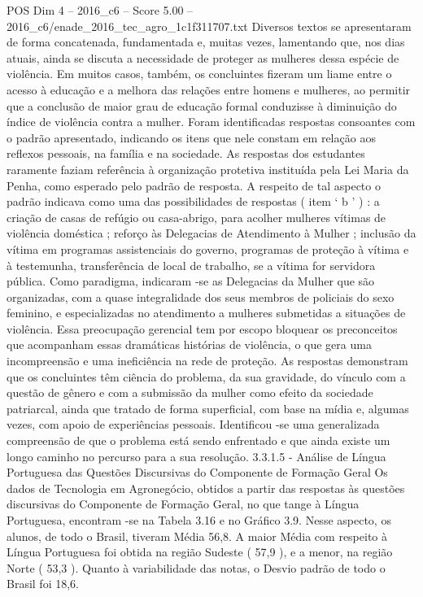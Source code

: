 \begin{textsample}{POS Dim 4 – 2016\_c6 – Score 5.00 – 2016\_c6/enade\_2016\_tec\_agro\_1c1f311707.txt}
Diversos textos se apresentaram de forma concatenada, fundamentada e, muitas vezes, lamentando que, nos dias atuais, ainda se discuta a necessidade de proteger as mulheres dessa espécie de violência.
Em muitos casos, também, os concluintes fizeram um liame entre o acesso à educação e a melhora das relações entre homens e mulheres, ao permitir que a conclusão de maior grau de educação formal conduzisse à diminuição do índice de violência contra a mulher.
Foram identificadas respostas consoantes com o padrão apresentado, indicando os itens que nele constam em relação aos reflexos pessoais, na família e na sociedade.
As respostas dos estudantes raramente faziam referência à organização protetiva instituída pela Lei Maria da Penha, como esperado pelo padrão de resposta.
A respeito de tal aspecto o padrão indicava como uma das possibilidades de respostas ( item ‘ b ’ ) : a criação de casas de refúgio ou casa-abrigo, para acolher mulheres vítimas de violência doméstica ; reforço às Delegacias de Atendimento à Mulher ; inclusão da vítima em programas assistenciais do governo, programas de proteção à vítima e à testemunha, transferência de local de trabalho, se a vítima for servidora pública.
Como paradigma, indicaram -se as Delegacias da Mulher que são organizadas, com a quase integralidade dos seus membros de policiais do sexo feminino, e especializadas no atendimento a mulheres submetidas a situações de violência.
Essa preocupação gerencial tem por escopo bloquear os preconceitos que acompanham essas dramáticas histórias de violência, o que gera uma incompreensão e uma ineficiência na rede de proteção.
As respostas demonstram que os concluintes têm ciência do problema, da sua gravidade, do vínculo com a questão de gênero e com a submissão da mulher como efeito da sociedade patriarcal, ainda que tratado de forma superficial, com base na mídia e, algumas vezes, com apoio de experiências pessoais.
Identificou -se uma generalizada compreensão de que o problema está sendo enfrentado e que ainda existe um longo caminho no percurso para a sua resolução. 3.3.1.5 - Análise de Língua Portuguesa das Questões Discursivas do Componente de Formação Geral Os dados de Tecnologia em Agronegócio, obtidos a partir das respostas às questões discursivas do Componente de Formação Geral, no que tange à Língua Portuguesa, encontram -se na Tabela 3.16 e no Gráfico 3.9.
Nesse aspecto, os alunos, de todo o Brasil, tiveram Média 56,8.
A maior Média com respeito à Língua Portuguesa foi obtida na região Sudeste ( 57,9 ), e a menor, na região Norte ( 53,3 ).
Quanto à variabilidade das notas, o Desvio padrão de todo o Brasil foi 18,6.

\end{textsample}
